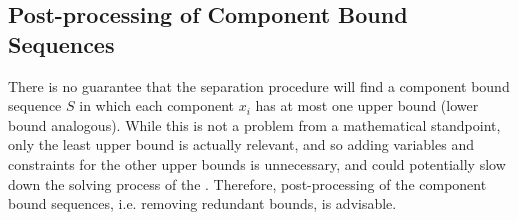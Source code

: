 \subsection{Post-processing of Component Bound Sequences}\label{sec:cmpbnd_separation_postprocessing}
There is no guarantee that the separation procedure will find a component bound sequence $S$ in which each component $x_i$ has at most one upper bound (lower bound analogous). While this is not a problem from a mathematical standpoint, only the least upper bound is actually relevant, and so adding variables and constraints for the other upper bounds is unnecessary, and could potentially slow down the solving process of the \SP{}. Therefore, post-processing of the component bound sequences, i.e. removing redundant bounds, is advisable.

